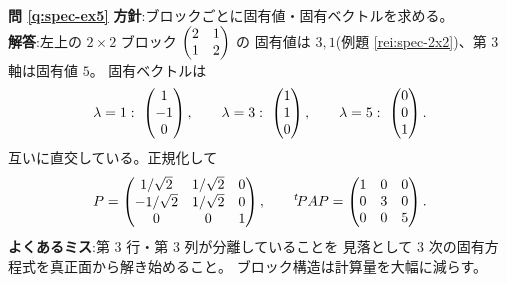 \bigskip
\noindent\textbf{問 \ref{q:spec-ex5}}\quad
\textbf{方針}:ブロックごとに固有値・固有ベクトルを求める。\\
\textbf{解答}:左上の $2 \times 2$ ブロック $\begin{pmatrix}2 & 1 \\ 1 & 2\end{pmatrix}$ の
固有値は $3, 1$(例題 \ref{rei:spec-2x2})、第 $3$ 軸は固有値 $5$。
固有ベクトルは
\[
\lambda = 1:\ \begin{pmatrix}1 \\ -1 \\ 0\end{pmatrix}, \qquad
\lambda = 3:\ \begin{pmatrix}1 \\ 1 \\ 0\end{pmatrix}, \qquad
\lambda = 5:\ \begin{pmatrix}0 \\ 0 \\ 1\end{pmatrix}.
\]
互いに直交している。正規化して
\[
P = \begin{pmatrix}1/\sqrt{2} & 1/\sqrt{2} & 0 \\ -1/\sqrt{2} & 1/\sqrt{2} & 0 \\
0 & 0 & 1\end{pmatrix}, \qquad
{}^t\!PAP = \begin{pmatrix}1 & 0 & 0 \\ 0 & 3 & 0 \\ 0 & 0 & 5\end{pmatrix}.
\]
\textbf{よくあるミス}:第 $3$ 行・第 $3$ 列が分離していることを
見落として $3$ 次の固有方程式を真正面から解き始めること。
ブロック構造は計算量を大幅に減らす。

